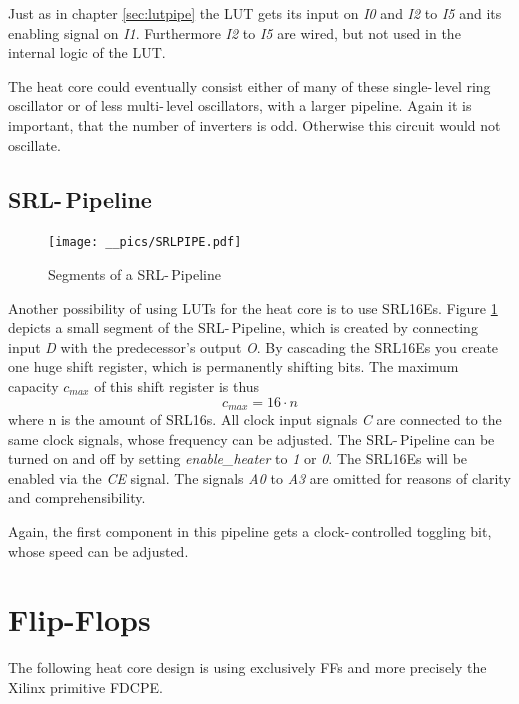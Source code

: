 Just as in chapter \ref{sec:lutpipe} the \ac{LUT} gets its input on \textit{I0} and \textit{I2} to \textit{I5} and its enabling signal on \textit{I1}. Furthermore \textit{I2} to \textit{I5} are wired, but not used in the internal logic of the \ac{LUT}. 

The heat core could eventually consist either of many of these single-\,level ring oscillator or of less multi-\,level oscillators, with a larger pipeline. Again it is important, that the number of inverters is odd. Otherwise this circuit would not oscillate. 


\subsection{SRL-\,Pipeline}
\label{sec:srlpipe}

\begin{figure}[h]
		\texttt{[image: \_\_pics/SRLPIPE.pdf]}
		\caption{Segments of a SRL-\,Pipeline}
		\label{pic:srlpipe}	
	\end{figure} 

Another possibility of using \acp{LUT} for the heat core is to use \acp{SRL16E}. Figure \ref{pic:srlpipe} depicts a small segment of the \ac{SRL}-\,Pipeline, which is created by connecting input \textit{D} with the predecessor's output \textit{O}. By cascading the \acp{SRL16E} you create one huge shift register, which is permanently shifting bits. The maximum capacity $c_{max}$ of this shift register is thus 
\begin{equation}
c_{max} = 16 \cdot n
\label{eq:srlcap}
\end{equation} where n is the amount of \acfp{SRL16}. All clock input signals \textit{C} are connected to the same clock signals, whose frequency can be adjusted. The \ac{SRL}-\,Pipeline can be turned on and off by setting \textit{enable\_heater} to \textit{1} or \textit{0}. The \acp{SRL16E} will be enabled via the \textit{CE} signal. The signals \textit{A0} to \textit{A3} are omitted for reasons of clarity and comprehensibility.

Again, the first component in this pipeline gets a clock-\,controlled toggling bit, whose speed can be adjusted.


\section{Flip-Flops}

The following heat core design is using exclusively \acp{FF} and more precisely the Xilinx primitive \acs{FDCPE}.


